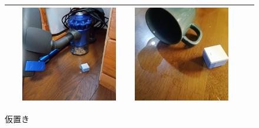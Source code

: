 \documentclass[paper=a4paper,jafontsize=9pt,head_space=15mm,gutter=20mm,
twocolumn,number_of_lines=49, line_length=26zw]{myuarticle}
\begin{document}
\begin{figure}[t]
\begin{tabular}{|c|c|c|c|c|}
\begin{minipage}[c]{0.15\textwidth}
    \end{minipage}     &
    \begin{minipage}[c]{0.15\textwidth}
      \centering
      \includegraphics[width=0.9\textwidth]{resources/vacuum_after.jpg}
    \end{minipage}  &
    \begin{minipage}[c]{0.15\textwidth}
      \centering
      \includegraphics[width=0.9\textwidth]{resources/water.jpg}
    \end{minipage}
    \\ \hline
  \end{tabular}
  \caption{仮置き}
\end{figure}
\end{document}
